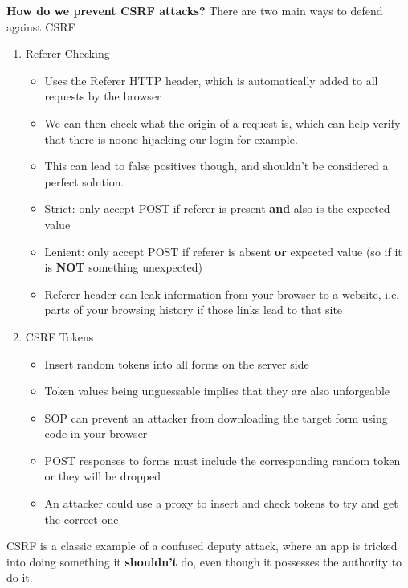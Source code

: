 \documentclass{article}
\begin{document}
\textbf{How do we prevent CSRF attacks?}
There are two main ways to defend against CSRF
\begin{enumerate}
    \item Referer Checking
        \begin{itemize}
            \item Uses the Referer HTTP header, which is automatically added to all requests by the browser
            \item We can then check what the origin of a request is, which can help verify that there is noone hijacking our login for example.
            \item This can lead to false positives though, and shouldn't be considered a perfect solution.
            \item Strict: only accept POST if referer is present \textbf{and} also is the expected value
            \item Lenient: only accept POST if referer is absent \textbf{or} expected value (so if it is \textbf{NOT} something unexpected)
            \item Referer header can leak information from your browser to a website, i.e. parts of your browsing history if those links lead to that site
        \end{itemize}
    \item CSRF Tokens
        \begin{itemize}
            \item Insert random tokens into all forms on the server side
            \item Token values being unguessable implies that they are also unforgeable
            \item SOP can prevent an attacker from downloading the target form using code in your browser
            \item POST responses to forms must include the corresponding random token or they will be dropped
            \item An attacker could use a proxy to insert and check tokens to try and get the correct one
        \end{itemize}
\end{enumerate}
CSRF is a classic example of a confused deputy attack, where an app is tricked into doing something it \textbf{shouldn't} do, even though it possesses the authority to do it.
\end{document}
